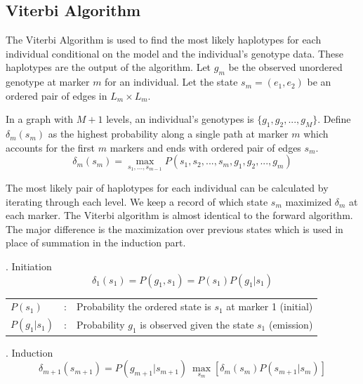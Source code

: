 \documentclass[a4paper,11pt,twoside,abstraction,titlepage]{article}
\begin{document}
\newpage
\subsection{Viterbi Algorithm}

The Viterbi Algorithm is used to find the most likely haplotypes for each individual conditional on the model and the individual's genotype data.  These haplotypes are the output of the algorithm.  Let $g_m$ be the observed unordered genotype at marker $m$ for an individual.  Let the state $s_m = (e_1, e_2)$ be an ordered pair of edges in $L_m \times L_m$.

In a graph with $M+1$ levels, an individual's genotypes is $\{g_1, g_2, ... , g_M\}$.  Define $\delta_m(s_m)$ as the highest probability along a single path at marker $m$ which accounts for the first $m$ markers and ends with ordered pair of edges $s_m$.
\begin{equation*}
\delta_m(s_m) = \max_{s_1,...,s_{m-1}} P(s_1,s_2,...,s_m, g_1, g_2,..., g_m)
\end{equation*}

The most likely pair of haplotypes for each individual can be calculated by iterating through each level.  We keep a record of which state $s_m$ maximized $\delta_m$ at each marker.  The Viterbi algorithm is almost identical to the forward algorithm.  The major difference is the maximization over previous states which is used in place of summation in the induction part. \cite{rabiner}

\vspace{10pt}
. Initiation
\begin{equation*}
\delta_1(s_1) = P(g_1, s_1) = P(s_1) P(g_1|s_1)
\end{equation*}

\begin{framed}
\begin{tabular}{lll}
\hspace{-20pt} $P(s_1)$ & : & \hspace{-5pt}Probability the ordered state is $s_1$ at marker 1 (initial)\\
\hspace{-20pt} $P(g_1|s_1)$ & :& \hspace{-5pt}Probability $g_1$ is observed given the state $s_1$ (emission)
\end{tabular}
\end{framed}


\vspace{10pt}
. Induction
\begin{equation*}
\delta_{m+1}(s_{m+1}) = P(g_{m+1}|s_{m+1}) \: \max_{s_m} \left[ \delta_m(s_m) P(s_{m+1}|s_m) \right] 
\end{equation*}
\end{document}
